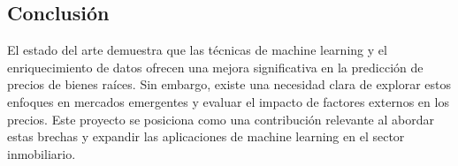\subsection{Conclusión}
El estado del arte demuestra que las técnicas de machine learning y el enriquecimiento de datos ofrecen una mejora significativa en la predicción de precios de bienes raíces. Sin embargo, existe una necesidad clara de explorar estos enfoques en mercados emergentes y evaluar el impacto de factores externos en los precios. Este proyecto se posiciona como una contribución relevante al abordar estas brechas y expandir las aplicaciones de machine learning en el sector inmobiliario.

